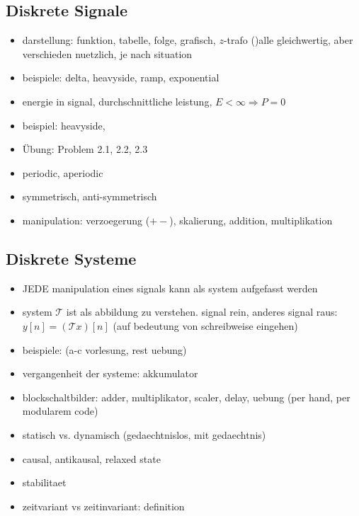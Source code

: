 
\cite[chp. 2.1]{proakis2013}


\subsection{Diskrete Signale}
\begin{itemize}
    \item darstellung: funktion, tabelle, folge, grafisch, $z$-trafo ()alle gleichwertig, aber verschieden nuetzlich, je nach situation
    \item beispiele: delta, heavyside, ramp, exponential
    \item energie in signal, durchschnittliche leistung, $E < \infty \Rightarrow P = 0$
    \item beispiel: heavyside, 
    \item \"Ubung: Problem 2.1, 2.2, 2.3
    \item periodic, aperiodic
    \item symmetrisch, anti-symmetrisch
    \item manipulation: verzoegerung ($+-$), skalierung, addition, multiplikation
\end{itemize}

\subsection{Diskrete Systeme}
\begin{itemize}
    \item JEDE manipulation eines signals kann als system aufgefasst werden
    \item system $\mathcal{T}$ ist als abbildung zu verstehen. signal rein, anderes signal raus: $y[n] = (\mathcal{T}x)[n]$ (auf bedeutung von schreibweise eingehen)
    \item beispiele: \cite[ex. 2.2.1]{proakis2013} (a-c vorlesung, rest uebung)
    \item vergangenheit der systeme: akkumulator
    \item blockschaltbilder: adder, multiplikator, scaler, delay, uebung \cite[ex 2.2.3]{proakis2013}(per hand, per modularem code)
    \item statisch vs. dynamisch (gedaechtnislos, mit gedaechtnis)
    \item causal, antikausal, relaxed state
    \item stabilitaet
    \item zeitvariant vs zeitinvariant: definition
\end{itemize}

